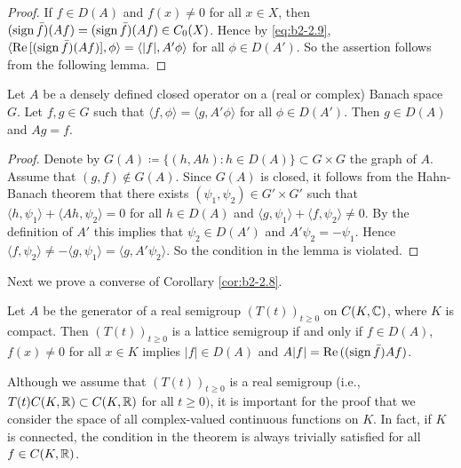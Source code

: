 \begin{proof}
If $f \in D(A)$ and $f(x) \neq 0$ for all $x \in X$, then $(\operatorname{sign} \bar{f})(Af) = (\operatorname{sign} \bar{f})(Af) \in C_{0}(X)$.
Hence by \eqref{eq:b2-2.9}, $\langle \mathop{}\!\mathrm{Re}\,[(\operatorname{sign} \bar{f})(Af)],\phi \rangle = \langle |f|,A'\phi \rangle$ for all $\phi \in D(A')$.
So the assertion follows from the following lemma.
\end{proof}

\begin{lemma}\label{lem:b2-2.9}
Let $A$ be a densely defined closed operator on a (real or complex) Banach space $G$.
Let $f, g \in G$ such that $\langle f,\phi \rangle = \langle g,A'\phi \rangle$ for all $\phi \in D(A')$.
Then $g \in D(A)$ and $Ag = f$.
\end{lemma}

\begin{proof}
Denote by $G(A) \coloneqq \{(h,Ah) : h \in D(A)\} \subset G \times G$ the graph of $A$.
Assume that $(g,f) \notin G(A)$.
Since $G(A)$ is closed, it follows from the Hahn-Banach theorem that there exists $(\psi_{1},\psi_{2}) \in G' \times G'$ such that $\langle h,\psi_{1} \rangle + \langle Ah,\psi_{2} \rangle = 0$ for all $h \in D(A)$ and $\langle g,\psi_{1} \rangle + \langle f,\psi_{2} \rangle \neq 0$.
By the definition of $A'$ this implies that $\psi_{2} \in D(A')$ and $A'\psi_{2} = -\psi_{1}$.
Hence $\langle f,\psi_{2} \rangle \neq -\langle g,\psi_{1} \rangle = \langle g,A'\psi_{2} \rangle$.
So the condition in the lemma is violated.
\end{proof}

Next we prove a converse of Corollary \ref{cor:b2-2.8}.

\begin{theorem}\label{thm:b2-2.10}
Let $A$ be the generator of a real semigroup $(T(t))_{t \geq 0}$ on $C(K,\mathbb{C})$, where $K$ is compact.
Then $(T(t))_{t \geq 0}$ is a lattice semigroup if and only if $f \in D(A)$, $f(x) \neq 0$ for all $x \in K$ implies $|f| \in D(A)$ and $A|f| = \mathop{}\!\mathrm{Re}\,((\operatorname{sign} \bar{f})Af)$.
\end{theorem}

\begin{remark*}\label{rem:b2-2.10-KGK}
Although we assume that $(T(t))_{t \geq 0}$ is a real semigroup (i.e.,\\ $T(t)C(K,\mathbb{R}) \subset C(K,\mathbb{R})$ for all $t \geq 0)$, it is important for the proof that we consider the space of all complex-valued continuous functions on $K$.
In fact, if $K$ is connected, the condition in the theorem is always trivially satisfied for all $f \in C(K,\mathbb{R})$.
\end{remark*}

